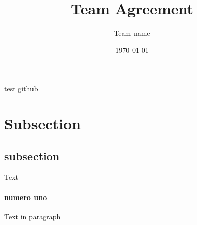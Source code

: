 \documentclass{article}
\title{Team Agreement}
\date{\today}
\author{Team name}
\begin{document}
    
    \newpage
    test github
    \section{Subsection}
    \subsection{subsection}
    Text
    \paragraph{numero uno}
    Text in paragraph
\end{document}
